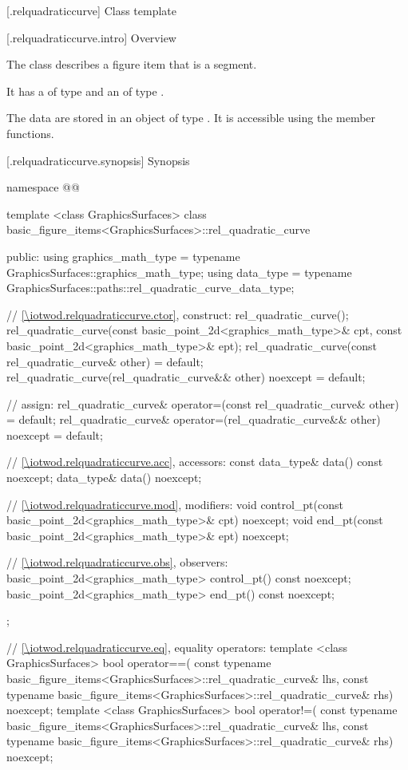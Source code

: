  [\iotwod.relquadraticcurve] {Class template }

 [\iotwod.relquadraticcurve.intro] {Overview}

\pnum
{}%
The class  describes a figure item that is a segment.

\pnum
It has a  of type  and an  of type .

\pnum
The data are stored in an object of type . It is accessible using the  member functions.

 [\iotwod.relquadraticcurve.synopsis] {Synopsis}
\begin{codeblock}
namespace @\fullnamespace{}@ {
  template <class GraphicsSurfaces>
  class basic_figure_items<GraphicsSurfaces>::rel_quadratic_curve {
  public:
    using graphics_math_type = typename GraphicsSurfaces::graphics_math_type;
    using data_type =
      typename GraphicsSurfaces::paths::rel_quadratic_curve_data_type;

    // \ref{\iotwod.relquadraticcurve.ctor}, construct:
    rel_quadratic_curve();
    rel_quadratic_curve(const basic_point_2d<graphics_math_type>& cpt,
      const basic_point_2d<graphics_math_type>& ept);
    rel_quadratic_curve(const rel_quadratic_curve& other) = default;
    rel_quadratic_curve(rel_quadratic_curve&& other) noexcept = default;

    // assign:
    rel_quadratic_curve& operator=(const rel_quadratic_curve& other) = default;
    rel_quadratic_curve& operator=(rel_quadratic_curve&& other) noexcept = default;

    // \ref{\iotwod.relquadraticcurve.acc}, accessors:
    const data_type& data() const noexcept;
    data_type& data() noexcept;

    // \ref{\iotwod.relquadraticcurve.mod}, modifiers:
    void control_pt(const basic_point_2d<graphics_math_type>& cpt) noexcept;
    void end_pt(const basic_point_2d<graphics_math_type>& ept) noexcept;

    // \ref{\iotwod.relquadraticcurve.obs}, observers:
    basic_point_2d<graphics_math_type> control_pt() const noexcept;
    basic_point_2d<graphics_math_type> end_pt() const noexcept;
  };

  // \ref{\iotwod.relquadraticcurve.eq}, equality operators:
  template <class GraphicsSurfaces>
  bool operator==(
    const typename basic_figure_items<GraphicsSurfaces>::rel_quadratic_curve& lhs,
    const typename basic_figure_items<GraphicsSurfaces>::rel_quadratic_curve& rhs) 
    noexcept;  
  template <class GraphicsSurfaces>
  bool operator!=(
    const typename basic_figure_items<GraphicsSurfaces>::rel_quadratic_curve& lhs,
    const typename basic_figure_items<GraphicsSurfaces>::rel_quadratic_curve& rhs) 
    noexcept;  
}
\end{codeblock}

